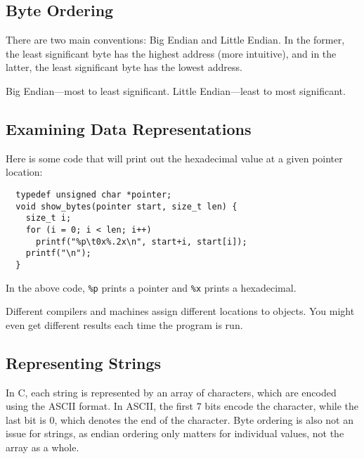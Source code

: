 \documentclass[class=article, crop=false]{standalone}
\begin{document}
  \subsection{Byte Ordering}
  There are two main conventions: Big Endian and Little Endian. In the former, the least significant byte has the highest address (more intuitive), and in the latter, the least significant byte has the lowest address.
  \begin{note}{}
    Big Endian---most to least significant. Little Endian---least to most significant.
  \end{note}
  \subsection{Examining Data Representations}
  Here is some code that will print out the hexadecimal value at a given pointer location:
  \begin{lstlisting}
  typedef unsigned char *pointer;
  void show_bytes(pointer start, size_t len) {
    size_t i;
    for (i = 0; i < len; i++)
      printf("%p\t0x%.2x\n", start+i, start[i]);
    printf("\n");
  }
  \end{lstlisting}
  In the above code, \texttt{\%p} prints a pointer and \texttt{\%x} prints a hexadecimal. 
  \begin{note}{}
    Different compilers and machines assign different locations to objects. You might even get different results each time the program is run.
  \end{note}
  \subsection{Representing Strings}
  In C, each string is represented by an array of characters, which are encoded using the ASCII format. In ASCII, the first $7$ bits encode the character, while the last bit is $0$, which denotes the end of the character. Byte ordering is also not an issue for strings, as endian ordering only matters for individual values, not the array as a whole.
\end{document}
